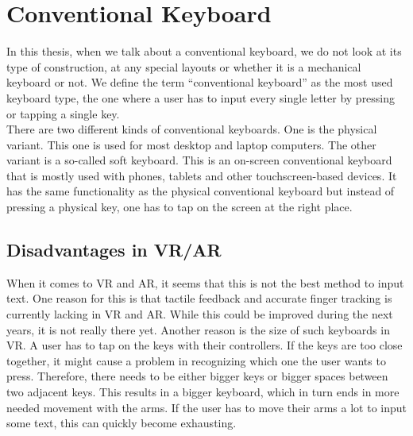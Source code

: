 \section{Conventional Keyboard}
In this thesis, when we talk about a conventional keyboard, we do not look at its type of construction, at any special layouts or whether it is a mechanical keyboard or not. We define the term ``conventional keyboard'' as the most used keyboard type, the one where a user has to input every single letter by pressing or tapping a single key.\\
There are two different kinds of conventional keyboards. One is the physical variant. This one is used for most desktop and laptop computers. The other variant is a so-called soft keyboard. This is an on-screen conventional keyboard that is mostly used with phones, tablets and other touchscreen-based devices. It has the same functionality as the physical conventional keyboard but instead of pressing a physical key, one has to tap on the screen at the right place.\\

\subsection{Disadvantages in VR/AR}
When it comes to VR and AR, it seems that this is not the best method to input text. One reason for this is that tactile feedback and accurate finger tracking is currently lacking in VR and AR. While this could be improved during the next years, it is not really there yet. Another reason is the size of such keyboards in VR. A user has to tap on the keys with their controllers. If the keys are too close together, it might cause a problem in recognizing which one the user wants to press. Therefore, there needs to be either bigger keys or bigger spaces between two adjacent keys. This results in a bigger keyboard, which in turn ends in more needed movement with the arms. If the user has to move their arms a lot to input some text, this can quickly become exhausting.

